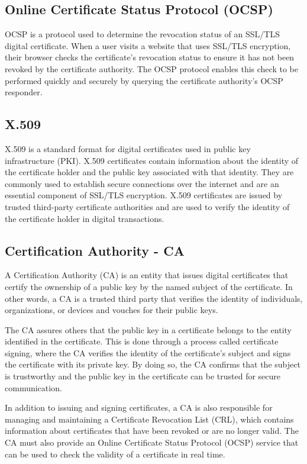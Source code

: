 \documentclass[12pt]{article}
\begin{document}
\subsection{Online Certificate Status Protocol (OCSP)}
OCSP is a protocol used to determine the revocation status of an SSL/TLS digital certificate. When a user visits a website that uses SSL/TLS encryption, their browser checks the certificate's revocation status to ensure it has not been revoked by the certificate authority. The OCSP protocol enables this check to be performed quickly and securely by querying the certificate authority's OCSP responder.

\subsection{X.509}
X.509 is a standard format for digital certificates used in public key infrastructure (PKI). X.509 certificates contain information about the identity of the certificate holder and the public key associated with that identity. They are commonly used to establish secure connections over the internet and are an essential component of SSL/TLS encryption. X.509 certificates are issued by trusted third-party certificate authorities and are used to verify the identity of the certificate holder in digital transactions.

\subsection{Certification Authority - CA}
A Certification Authority (CA) is an entity that issues digital certificates that certify the ownership of a public key by the named subject of the certificate. In other words, a CA is a trusted third party that verifies the identity of individuals, organizations, or devices and vouches for their public keys.

The CA assures others that the public key in a certificate belongs to the entity identified in the certificate. This is done through a process called certificate signing, where the CA verifies the identity of the certificate's subject and signs the certificate with its private key. By doing so, the CA confirms that the subject is trustworthy and the public key in the certificate can be trusted for secure communication.

In addition to issuing and signing certificates, a CA is also responsible for managing and maintaining a Certificate Revocation List (CRL), which contains information about certificates that have been revoked or are no longer valid. The CA must also provide an Online Certificate Status Protocol (OCSP) service that can be used to check the validity of a certificate in real time.
\end{document}
